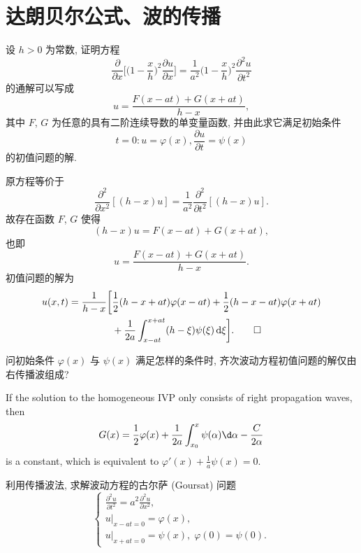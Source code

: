 \section{达朗贝尔公式、波的传播}

\begin{exercise}
  设 $h>0$ 为常数, 证明方程
  \[\frac{\partial}{\partial x}\biggl[\biggl(1-\frac{x}{h}\biggr)^2
    \frac{\partial u}{\partial x}\biggr]
    = \frac{1}{a^2}\biggl(1-\frac{x}{h}\biggr)^2 \frac{\partial^2u}{\partial t^2}\]
  的通解可以写成
  \[u = \frac{F(x-at)+G(x+at)}{h-x},\]
  其中 $F$, $G$ 为任意的具有二阶连续导数的单变量函数, 并由此求它满足初始条件
  \[t=0: u = \varphi(x), \frac{\partial u}{\partial t} = \psi(x)\]
  的初值问题的解.
\end{exercise}

\begin{solve}
  原方程等价于
  \[\frac{\partial^2}{\partial x^2}[(h-x)u]
    = \frac{1}{a^2}\frac{\partial^2}{\partial t^2}[(h-x)u].\]
  故存在函数 $F$, $G$ 使得
  \[(h-x)u = F(x-at) + G(x+at),\]
  也即
  \[u = \frac{F(x-at)+G(x+at)}{h-x}.\]
  初值问题的解为
  \begin{align*}
    u(x,t)
     = \frac{1}{h-x}\biggl[
      & \frac12 (h-x+at)\varphi(x-at) + \frac12 (h-x-at)\varphi(x+at) \\
      & + \frac{1}{2a}\int_{x-at}^{x+at} (h-\xi)\psi(\xi)\mathop{}\!\mathrm{d}\xi\biggr]. \qedhere
  \end{align*}
\end{solve}


\begin{exercise}
  问初始条件 $\varphi(x)$ 与 $\psi(x)$ 满足怎样的条件时,
  齐次波动方程初值问题的解仅由右传播波组成?
\end{exercise}

\begin{solution}
  If the solution to the homogeneous IVP only consists of right propagation
  waves, then
  \[ G(x) = \frac12\varphi(x) + \frac{1}{2a}\int_{x_0}^x \psi(\alpha) \d\alpha
    - \frac{C}{2\alpha} \]
  is a constant, which is equivalent to $\varphi'(x) + \frac1a \psi(x) = 0$.
\end{solution}


\begin{exercise}[3]
  利用传播波法, 求解波动方程的古尔萨 (Goursat) 问题
  \[\begin{cases}
    \frac{\partial^2u}{\partial t^2} = a^2 \frac{\partial^2u}{\partial x^2}, \\
    u|_{x-at=0} = \varphi(x), \\
    u|_{x+at=0} = \psi(x),\; \varphi(0) = \psi(0).
  \end{cases}\]
\end{exercise}

